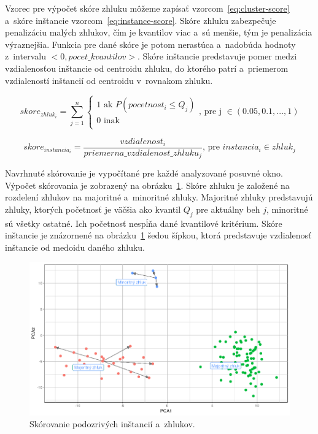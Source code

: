 \documentclass[a4paper,twoside,slovak,12pt,appendix]{article}
\begin{document}
\noindent
Vzorec pre výpočet skóre zhluku môžeme zapísať vzorcom~\ref{eq:cluster-score}
a~skóre inštancie vzorcom~\ref{eq:instance-score}. Skóre zhluku zabezpečuje
penalizáciu malých zhlukov, čím je kvantilov viac a~sú menšie, tým je
penalizácia výraznejšia. Funkcia pre dané skóre je potom nerastúca
a~nadobúda hodnoty z~intervalu $<0, pocet\_kvantilov>$. Skóre inštancie
predstavuje pomer medzi vzdialenosťou inštancie od centroidu zhluku, do ktorého
patrí a~priemerom vzdialeností inštancií od centroidu v~rovnakom zhluku.

\begin{equation}
  skore_{zhluk_i} = \sum_{j=1}^{n}
  \begin{cases}
    1 \text{ ak } P(pocetnost_i \leq Q_j) \\
    0 \text{ inak } \\
  \end{cases}
  \text{, pre j } \in (0.05, 0.1, ..., 1)
  \label{eq:cluster-score}
\end{equation}

\begin{equation}
  skore_{instancia_i} = \frac{vzdialenost_i}{priemerna\_vzdialenost\_zhluku_j} \text{, pre } instancia_i \in zhluk_j
  \label{eq:instance-score}
\end{equation}

\noindent
Navrhnuté skórovanie je vypočítané pre každé analyzované posuvné okno. Výpočet
skórovania je zobrazený na obrázku~\ref{fig:clustering-score}. Skóre zhluku je
založené na rozdelení zhlukov na majoritné a~minoritné zhluky. Majoritné zhluky
predstavujú zhluky, ktorých početnosť je väčšia ako kvantil $Q_j$ pre aktuálny
beh $j$, minoritné sú všetky ostatné. Ich početnosť nespĺňa dané kvantilové
kritérium. Skóre inštancie je znázornené na obrázku~\ref{fig:clustering-score}
šedou šípkou, ktorá predstavuje vzdialenosť inštancie od medoidu daného zhluku.

\begin{figure}[htbp]
  \centering
  \includegraphics[width=\textwidth]{clustering_score.png}
  \caption{Skórovanie podozrivých inštancií a~zhlukov.}
  \label{fig:clustering-score}
\end{figure}
\end{document}
